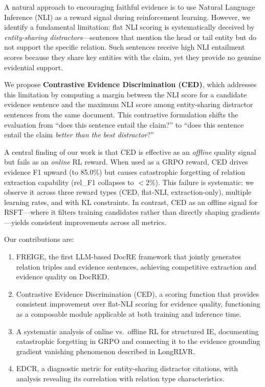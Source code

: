 \documentclass[11pt,a4paper]{article}
\newcommand{\method}{FREIGE}
\newcommand{\ced}{CED}
\newcommand{\edcr}{EDCR}
\begin{document}
A natural approach to encouraging faithful evidence is to use Natural Language Inference (NLI) as a reward signal during reinforcement learning. However, we identify a fundamental limitation: flat NLI scoring is systematically deceived by \emph{entity-sharing distractors}---sentences that mention the head or tail entity but do not support the specific relation. Such sentences receive high NLI entailment scores because they share key entities with the claim, yet they provide no genuine evidential support.

We propose \textbf{Contrastive Evidence Discrimination (\ced{})}, which addresses this limitation by computing a margin between the NLI score for a candidate evidence sentence and the maximum NLI score among entity-sharing distractor sentences from the same document. This contrastive formulation shifts the evaluation from ``does this sentence entail the claim?'' to ``does this sentence entail the claim \emph{better than the best distractor}?''

A central finding of our work is that \ced{} is effective as an \emph{offline} quality signal but fails as an \emph{online} RL reward. When used as a GRPO reward, \ced{} drives evidence F1 upward (to 85.0\%) but causes catastrophic forgetting of relation extraction capability (rel\_F1 collapses to $<$2\%). This failure is systematic: we observe it across three reward types (CED, flat-NLI, extraction-only), multiple learning rates, and with KL constraints. In contrast, \ced{} as an offline signal for RSFT---where it filters training candidates rather than directly shaping gradients---yields consistent improvements across all metrics.

Our contributions are:
\begin{enumerate}
    \item \method{}, the first LLM-based DocRE framework that jointly generates relation triples and evidence sentences, achieving competitive extraction and evidence quality on DocRED.
    \item Contrastive Evidence Discrimination (\ced{}), a scoring function that provides consistent improvement over flat-NLI scoring for evidence quality, functioning as a composable module applicable at both training and inference time.
    \item A systematic analysis of online vs.\ offline RL for structured IE, documenting catastrophic forgetting in GRPO and connecting it to the evidence grounding gradient vanishing phenomenon described in LongRLVR.
    \item \edcr{}, a diagnostic metric for entity-sharing distractor citations, with analysis revealing its correlation with relation type characteristics.
\end{enumerate}
\end{document}
